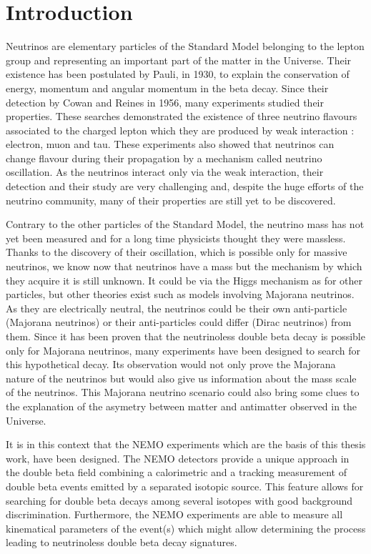 \documentclass[main.tex]{subfiles}
\begin{document}
\chapter*{Introduction}


\NI Neutrinos are elementary particles of the Standard Model belonging to the lepton group and representing an important part of the matter in the Universe. Their existence has been postulated by Pauli, in 1930, to explain the conservation of energy, momentum and angular momentum in the beta decay. Since their detection by Cowan and Reines in 1956, many experiments studied their properties. These searches demonstrated the existence of three neutrino flavours associated to the charged lepton which they are produced by weak interaction : electron, muon and tau. These experiments also showed that neutrinos can change flavour during their propagation by a mechanism called neutrino oscillation. As the neutrinos interact only via the weak interaction, their detection and their study are very challenging and, despite the huge efforts of the neutrino community, many of their properties are still yet to be discovered.


\bigskip


\NI Contrary to the other particles of the Standard Model, the neutrino mass has not yet been measured and for a long time physicists thought they were massless. Thanks to the discovery of their oscillation, which is possible only for massive neutrinos, we know now that neutrinos have a mass but the mechanism by which they acquire it is still unknown. It could be via the Higgs mechanism as for other particles, but other theories exist such as models involving Majorana neutrinos. As they are electrically neutral, the neutrinos could be their own anti-particle (Majorana neutrinos) or their anti-particles could differ (Dirac neutrinos) from them. Since it has been proven that the neutrinoless double beta decay is possible only for Majorana neutrinos, many experiments have been designed to search for this hypothetical decay. Its observation would not only prove the Majorana nature of the neutrinos but would also give us information about the mass scale of the neutrinos. This Majorana neutrino scenario could also bring some clues to the explanation of the asymetry between matter and antimatter observed in the Universe.


\bigskip


\NI It is in this context that the NEMO experiments which are the basis of this thesis work, have been designed. The NEMO detectors provide a unique approach in the double beta field combining a calorimetric and a tracking measurement of double beta events emitted by a separated isotopic source. This feature allows for searching for double beta decays among several isotopes with good background discrimination. Furthermore, the NEMO experiments are able to measure all kinematical parameters of the event(s) which might allow determining the process leading to neutrinoless double beta decay signatures.
\end{document}
